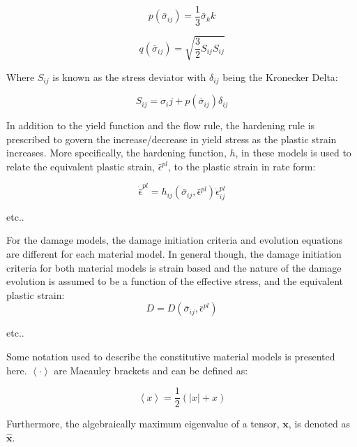 \begin{equation}
p\left(\bar{\sigma}_{ij}\right)=\frac{1}{3}\bar{\sigma}_kk
\label{eqn:druc3}
\end{equation}

\begin{equation}
q\left(\bar{\sigma}_{ij}\right)=\sqrt{\frac{3}{2}S_{ij}S_{ij}}\label{eqn:druc4}
\end{equation}

Where $S_{ij}$ is known as the stress deviator with $\delta_{ij}$ being the Kronecker Delta:

\begin{equation}
S_{ij} = \sigma_ij + p\left(\bar{\sigma}_{ij}\right)\delta_{ij}
\end{equation}

In addition to the yield function and the flow rule, the hardening rule is prescribed to govern the increase/decrease in yield stress as the plastic strain increases. More specifically, the hardening function, $h$, in these models is used to relate the equivalent plastic strain, $\bar{\epsilon}^{pl}$,  to the plastic strain in rate form: 

\begin{equation}
    \dot{\bar{\epsilon}}^{pl} 
    = 
    h_{ij}
    \left(
        \bar{\sigma}_{ij}, \bar{\epsilon}^{pl}
    \right)
    \dot{\epsilon}^{pl}_{ij}
\label{eqn:const8d}
\end{equation}

etc..

For the damage models, the damage initiation criteria and evolution equations are different for each material model. In general though, the damage initiation criteria for both material models is strain based and the nature of the damage evolution is assumed to be a function of the effective stress, and the equivalent plastic strain:
\begin{equation}
D=D\left(\bar{\sigma}_{ij},\bar{\epsilon}^{pl}\right)\label{eqn:const8}
\end{equation}



etc..

Some notation used to describe the constitutive material models is presented here. $\left\langle \cdotp\right\rangle $ are Macauley brackets and can be defined as:

\begin{equation}
\left\langle x\right\rangle =\frac{1}{2}\left(\left|x\right|+x\right)\label{eqn:const9-3}
\end{equation}

Furthermore, the algebraically maximum eigenvalue of a tensor, $\mathbf{x}$, is denoted as $\hat{\mathbf{x}}$.



